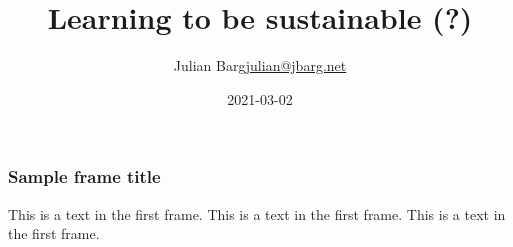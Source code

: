 \documentclass{beamer}
\title{Learning to be sustainable (?)}
\author{\texorpdfstring{Julian Barg\newline\url{julian@jbarg.net}}{Author}
	}
\institute{Ivey Business School}
\date{2021-03-02}
\begin{document}
	{
		\frame{\titlepage}  
	}

	\begin{frame}
	\frametitle{Sample frame title}
	This is a text in the first frame. This is a text in the first frame. This is a text in the first frame.
	\end{frame}
\end{document}
